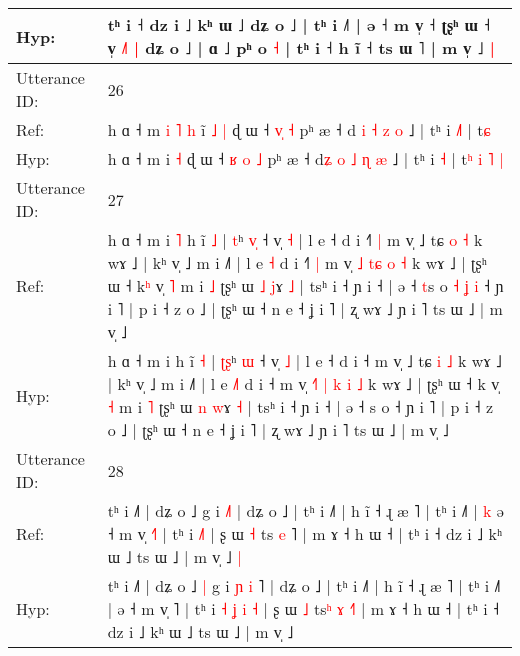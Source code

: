 \documentclass[10pt]{article}
\DeclareRobustCommand{\hl}[1]{{\textcolor{red}{#1}}}
\begin{document}
\begin{longtable}{ll}
 \\
Hyp: & tʰ i ˧ dz i ˩ kʰ ɯ ˩ dʑ o ˩ | tʰ i ˩˥ | ə ˧ m v̩ ˧ ʈʂʰ ɯ ˧ v̩ \hl{˩}˥\hl{ }\hl{|} dʑ o ˩ | ɑ ˩ pʰ o \hl{}\hl{˧} | tʰ i ˧ h ĩ ˧ ts ɯ ˥ | m v̩ ˩\hl{ }\hl{|}
 \\
\midrule
Utterance ID: & 26 \\
Ref: & h ɑ ˧ m\hl{ }\hl{i}\hl{ }\hl{˥}\hl{ }\hl{h} i\hl{̃}\hl{ }\hl{˩} \hl{|} ɖ ɯ ˧ \hl{}\hl{v}\hl{̩} \hl{˧} pʰ æ ˧ d\hl{} \hl{i} \hl{˧} \hl{z} \hl{o} ˩ | tʰ i \hl{˩}\hl{˥} | t\hl{}\hl{}\hl{}\hl{}\hl{}\hl{}\hl{ɕ}
 \\
Hyp: & h ɑ ˧ m\hl{}\hl{}\hl{}\hl{}\hl{}\hl{} i\hl{}\hl{}\hl{} \hl{˧} ɖ ɯ ˧ \hl{ʁ}\hl{ }\hl{o} \hl{˩} pʰ æ ˧ d\hl{ʑ} \hl{o} \hl{˩} \hl{ɳ} \hl{æ} ˩ | tʰ i \hl{}\hl{˧} | t\hl{ʰ}\hl{ }\hl{i}\hl{ }\hl{˥}\hl{ }\hl{|}
 \\
\midrule
Utterance ID: & 27 \\
Ref: & h ɑ ˧ m i\hl{ }\hl{˥} h ĩ \hl{˩} | \hl{}\hl{t}ʰ \hl{v}\hl{̩} ˧ v̩ \hl{˧} | l e ˧ d i ˧\hl{˥}\hl{ }\hl{|} m v̩ ˩ tɕ \hl{o} \hl{˧} k wɤ ˩ | kʰ v̩ ˩ m i ˩˥ | l e \hl{}\hl{˧} d i ˧\hl{˥}\hl{ }\hl{|} m v̩ \hl{}\hl{˩} \hl{}\hl{t}\hl{ɕ} \hl{o} \hl{˧} k wɤ ˩ | ʈʂʰ ɯ ˧ k\hl{ʰ} v̩ \hl{˥} m i \hl{˩} ʈʂʰ ɯ \hl{˩} \hl{j}ɤ \hl{˩} | tsʰ i ˧ ɲ i ˧ | ə ˧ \hl{t}s o\hl{ }\hl{˧}\hl{ }\hl{ʝ}\hl{ }\hl{i} ˧ ɲ i ˥ | p i ˧ z o ˩ | ʈʂʰ ɯ ˧ n e ˧ ʝ i ˥ | ʐ wɤ ˩ ɲ i ˥ ts ɯ ˩ | m v̩ ˩
 \\
Hyp: & h ɑ ˧ m i\hl{}\hl{} h ĩ \hl{˧} | \hl{ʈ}\hl{ʂ}ʰ \hl{}\hl{ɯ} ˧ v̩ \hl{˩} | l e ˧ d i ˧\hl{}\hl{}\hl{} m v̩ ˩ tɕ \hl{i} \hl{˩} k wɤ ˩ | kʰ v̩ ˩ m i ˩˥ | l e \hl{˩}\hl{˥} d i ˧\hl{}\hl{}\hl{} m v̩ \hl{˧}\hl{˥} \hl{|}\hl{ }\hl{k} \hl{i} \hl{˩} k wɤ ˩ | ʈʂʰ ɯ ˧ k\hl{} v̩ \hl{˧} m i \hl{˥} ʈʂʰ ɯ \hl{n} \hl{w}ɤ \hl{˧} | tsʰ i ˧ ɲ i ˧ | ə ˧ \hl{}s o\hl{}\hl{}\hl{}\hl{}\hl{}\hl{} ˧ ɲ i ˥ | p i ˧ z o ˩ | ʈʂʰ ɯ ˧ n e ˧ ʝ i ˥ | ʐ wɤ ˩ ɲ i ˥ ts ɯ ˩ | m v̩ ˩
 \\
\midrule
Utterance ID: & 28 \\
Ref: & tʰ i ˩˥ | dʑ o ˩\hl{}\hl{} g i\hl{}\hl{} \hl{}\hl{˩}˥ | dʑ o ˩ | tʰ i ˩˥ | h ĩ ˧ ɻ æ ˥ | tʰ i ˩˥ |\hl{ }\hl{k} ə ˧ m v̩ \hl{˧}˥ | tʰ i\hl{}\hl{}\hl{}\hl{} \hl{}\hl{˩}\hl{˥} | ʂ ɯ \hl{˧} ts\hl{} \hl{e} \hl{}˥ | m ɤ ˧ h ɯ ˧ | tʰ i ˧ dz i ˩ kʰ ɯ ˩ ts ɯ ˩ | m v̩ ˩\hl{ }\hl{|}
 \\
Hyp: & tʰ i ˩˥ | dʑ o ˩\hl{ }\hl{|} g i\hl{ }\hl{ɲ} \hl{i}\hl{ }˥ | dʑ o ˩ | tʰ i ˩˥ | h ĩ ˧ ɻ æ ˥ | tʰ i ˩˥ |\hl{}\hl{} ə ˧ m v̩ \hl{}˥ | tʰ i\hl{ }\hl{˧}\hl{ }\hl{ʝ} \hl{i}\hl{ }\hl{˧} | ʂ ɯ \hl{˩} ts\hl{ʰ} \hl{ɤ} \hl{˧}˥ | m ɤ ˧ h ɯ ˧ | tʰ i ˧ dz i ˩ kʰ ɯ ˩ ts ɯ ˩ | m v̩ ˩\hl{}\hl{}

\end{longtable}
\end{document}
